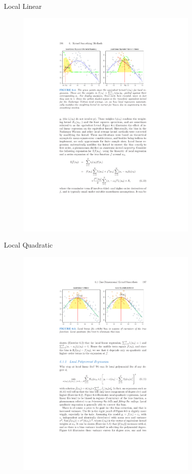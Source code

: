 \documentclass[11pt,handout,xcolor=pdftex,dvipsnames,table,mathserif]{beamer}
\begin{document}
 \begin{frame}{Local Linear}
\begin{figure}[htbp]
\begin{center}
\includegraphics[width=3.5in]{./resources/nwloclinear2.pdf}
\label{loclinear2}
\end{center}
\end{figure}
\end{frame}


 \begin{frame}{Local Quadratic}
\begin{figure}[htbp]
\begin{center}
\includegraphics[width=3.5in]{./resources/locquad.pdf}
\label{loclinear2}
\end{center}
\end{figure}
\end{frame}
\end{document}
